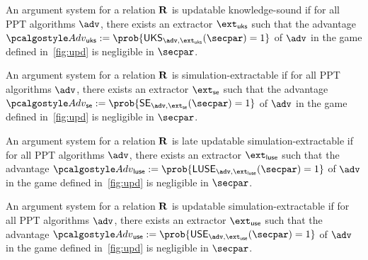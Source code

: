 
\begin{definition}\label{upd-KS}
	An argument system for a relation $\mathbf{R}$ is updatable knowledge-sound if for all PPT algorithms $\advse$, there exists an extractor $\ext_{\uks}$ such that the advantage $\Adv_{\uks} := \prob{\UKS_{\advse,\ext_{\uks}}(\secpar) = 1}$ of $\advse$ in the game defined in~\cref{fig:upd} is negligible in $\secpar$.
\end{definition}

\begin{definition}\label{se}
	An argument system for a relation $\mathbf{R}$ is simulation-extractable if for all PPT algorithms $\advse$, there exists an extractor $\ext_{\se}$ such that the advantage $\Adv_{\se}:=\prob{ \SE_{\advse,\ext_{\se}}(\secpar) = 1}$ of $\advse$ in the game defined in~\cref{fig:upd} is negligible in $\secpar$.
\end{definition}

\begin{definition}\label{late-use}
	An argument system for a relation $\mathbf{R}$ is late updatable simulation-extractable if for all PPT algorithms $\advse$, there exists an extractor $\ext_{\luse}$ such that the advantage $\Adv_{\luse}:=\prob{ \LUSE_{\advse,\ext_{\luse}}(\secpar) = 1}$ of $\advse$ in the game defined in~\cref{fig:upd} is negligible in $\secpar$.
\end{definition}

\begin{definition}\label{USE}
	An argument system for a relation $\mathbf{R}$ is updatable simulation-extractable if for all PPT algorithms $\advse$, there exists an extractor $\ext_{\use}$ such that the advantage $\Adv_{\use} := \prob{ \USE_{\advse,\ext_{\use}}(\secpar) = 1}$ of $\advse$ in the game defined in~\cref{fig:upd} is negligible in $\secpar$.
\end{definition}

